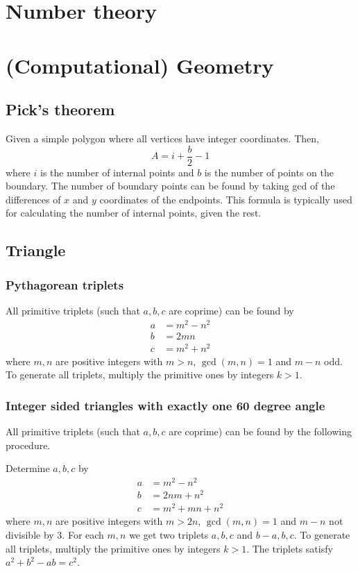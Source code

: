 \documentclass[a4paper,11pt]{article}
\begin{document}
\section{Number theory}

\section{(Computational) Geometry}

\subsection{Pick's theorem}

Given a simple polygon where all vertices have integer coordinates. Then, $$A=i+\frac{b}{2}-1$$ where $i$ is the number of internal points and $b$ is the number of points on the boundary. The number of boundary points can be found by taking gcd of the differences of $x$ and $y$ coordinates of the endpoints. This formula is typically used for calculating the number of internal points, given the rest.

\subsection{Triangle}

\subsubsection{Pythagorean triplets}

All primitive triplets (such that $a,b,c$ are coprime) can be found by
\begin{align*}
	a&=m^2-n^2\\
	b&=2mn\\
	c&=m^2+n^2
\end{align*}
where $m,n$ are positive integers with $m>n$, $\gcd(m,n)=1$ and $m-n$ odd. To generate all triplets, multiply the primitive ones by integers $k>1$.

\subsubsection{Integer sided triangles with exactly one 60 degree angle}

All primitive triplets (such that $a,b,c$ are coprime) can be found by the following procedure.

Determine $a,b,c$ by
\begin{align*}
	a&=m^2-n^2\\
	b&=2nm+n^2\\
	c&=m^2+mn+n^2
\end{align*}
where $m,n$ are positive integers with $m>2n$, $\gcd(m,n)=1$ and $m-n$ not divisible by 3. For each $m,n$ we get two triplets $a,b,c$ and $b-a,b,c$. To generate all triplets, multiply the primitive ones by integers $k>1$. The triplets satisfy $a^2+b^2-ab=c^2$.
\end{document}
